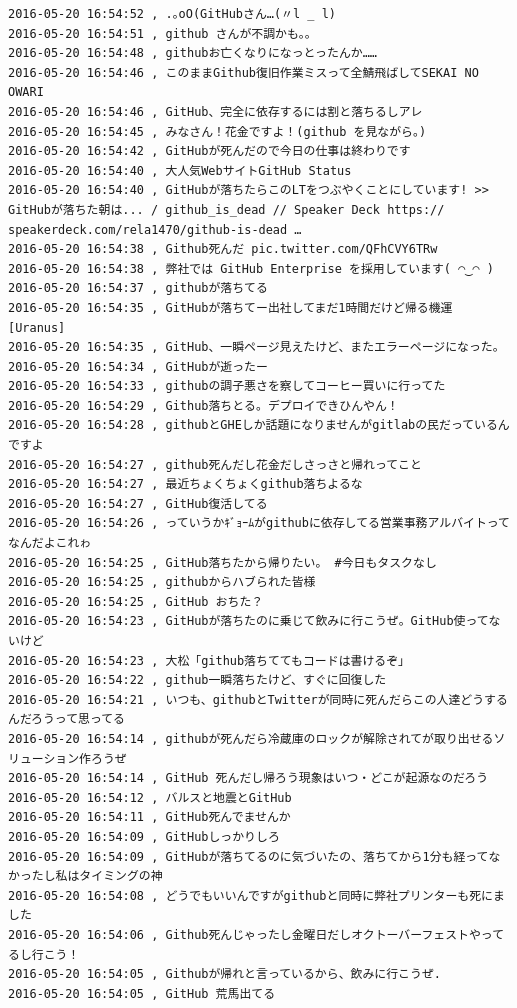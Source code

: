\begin{verbatim}
2016-05-20 16:54:52 , .｡oO(GitHubさん…(〃l _ l)
2016-05-20 16:54:51 , github さんが不調かも。。
2016-05-20 16:54:48 , githubお亡くなりになっとったんか……
2016-05-20 16:54:46 , このままGithub復旧作業ミスって全鯖飛ばしてSEKAI NO OWARI
2016-05-20 16:54:46 , GitHub、完全に依存するには割と落ちるしアレ
2016-05-20 16:54:45 , みなさん！花金ですよ！(github を見ながら。)
2016-05-20 16:54:42 , GitHubが死んだので今日の仕事は終わりです
2016-05-20 16:54:40 , 大人気WebサイトGitHub Status
2016-05-20 16:54:40 , GitHubが落ちたらこのLTをつぶやくことにしています! >> GitHubが落ちた朝は... / github_is_dead // Speaker Deck https://
speakerdeck.com/rela1470/github-is-dead …
2016-05-20 16:54:38 , Github死んだ pic.twitter.com/QFhCVY6TRw
2016-05-20 16:54:38 , 弊社では GitHub Enterprise を採用しています( ◠‿◠ )
2016-05-20 16:54:37 , githubが落ちてる
2016-05-20 16:54:35 , GitHubが落ちてー出社してまだ1時間だけど帰る機運 [Uranus]
2016-05-20 16:54:35 , GitHub、一瞬ページ見えたけど、またエラーページになった。
2016-05-20 16:54:34 , GitHubが逝ったー
2016-05-20 16:54:33 , githubの調子悪さを察してコーヒー買いに行ってた
2016-05-20 16:54:29 , Github落ちとる。デプロイできひんやん！
2016-05-20 16:54:28 , githubとGHEしか話題になりませんがgitlabの民だっているんですよ
2016-05-20 16:54:27 , github死んだし花金だしさっさと帰れってこと
2016-05-20 16:54:27 , 最近ちょくちょくgithub落ちよるな
2016-05-20 16:54:27 , GitHub復活してる
2016-05-20 16:54:26 , っていうかｷﾞｮｰﾑがgithubに依存してる営業事務アルバイトってなんだよこれゎ
2016-05-20 16:54:25 , GitHub落ちたから帰りたい。 #今日もタスクなし
2016-05-20 16:54:25 , githubからハブられた皆様
2016-05-20 16:54:25 , GitHub おちた？
2016-05-20 16:54:23 , GitHubが落ちたのに乗じて飲みに行こうぜ。GitHub使ってないけど
2016-05-20 16:54:23 , 大松「github落ちててもコードは書けるぞ」
2016-05-20 16:54:22 , github一瞬落ちたけど、すぐに回復した
2016-05-20 16:54:21 , いつも、githubとTwitterが同時に死んだらこの人達どうするんだろうって思ってる
2016-05-20 16:54:14 , githubが死んだら冷蔵庫のロックが解除されてが取り出せるソリューション作ろうぜ
2016-05-20 16:54:14 , GitHub 死んだし帰ろう現象はいつ・どこが起源なのだろう
2016-05-20 16:54:12 , バルスと地震とGitHub
2016-05-20 16:54:11 , GitHub死んでませんか
2016-05-20 16:54:09 , GitHubしっかりしろ
2016-05-20 16:54:09 , GitHubが落ちてるのに気づいたの、落ちてから1分も経ってなかったし私はタイミングの神
2016-05-20 16:54:08 , どうでもいいんですがgithubと同時に弊社プリンターも死にました
2016-05-20 16:54:06 , Github死んじゃったし金曜日だしオクトーバーフェストやってるし行こう！
2016-05-20 16:54:05 , Githubが帰れと言っているから、飲みに行こうぜ.
2016-05-20 16:54:05 , GitHub 荒馬出てる

\end{verbatim}
